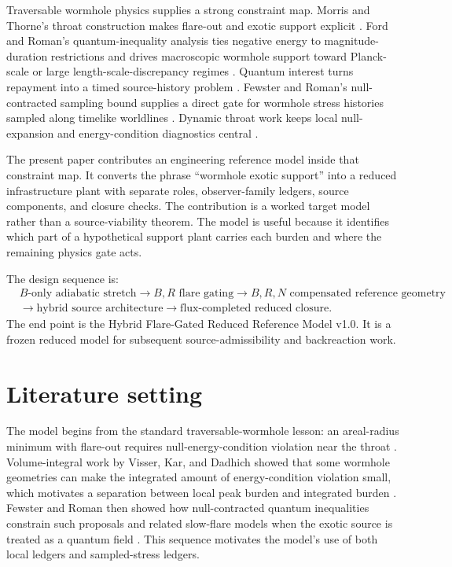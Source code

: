 \documentclass[11pt]{article}
\begin{document}
Traversable wormhole physics supplies a strong constraint map.  Morris and Thorne's throat construction makes flare-out and exotic support explicit \citep{morris_thorne_1988}.  Ford and Roman's quantum-inequality analysis ties negative energy to magnitude-duration restrictions and drives macroscopic wormhole support toward Planck-scale or large length-scale-discrepancy regimes \citep{ford_roman_1996}.  Quantum interest turns repayment into a timed source-history problem \citep{ford_roman_1999}.  Fewster and Roman's null-contracted sampling bound supplies a direct gate for wormhole stress histories sampled along timelike worldlines \citep{fewster_roman_2005}.  Dynamic throat work keeps local null-expansion and energy-condition diagnostics central \citep{hochberg_visser_1998}.

The present paper contributes an engineering reference model inside that constraint map.  It converts the phrase ``wormhole exotic support'' into a reduced infrastructure plant with separate roles, observer-family ledgers, source components, and closure checks.  The contribution is a worked target model rather than a source-viability theorem.  The model is useful because it identifies which part of a hypothetical support plant carries each burden and where the remaining physics gate acts.

The design sequence is:
\begin{equation}
\begin{aligned}
&B\text{-only adiabatic stretch}
\rightarrow B,R\text{ flare gating}
\rightarrow B,R,N\text{ compensated reference geometry}\\
&\rightarrow \text{hybrid source architecture}
\rightarrow \text{flux-completed reduced closure}.
\end{aligned}
\label{eq:design_sequence}
\end{equation}
The end point is the Hybrid Flare-Gated Reduced Reference Model v1.0.  It is a frozen reduced model for subsequent source-admissibility and backreaction work.

\section{Literature setting}

The model begins from the standard traversable-wormhole lesson: an areal-radius minimum with flare-out requires null-energy-condition violation near the throat \citep{morris_thorne_1988}.  Volume-integral work by Visser, Kar, and Dadhich showed that some wormhole geometries can make the integrated amount of energy-condition violation small, which motivates a separation between local peak burden and integrated burden \citep{visser_kar_dadhich_2003,kar_dadhich_visser_2004}.  Fewster and Roman then showed how null-contracted quantum inequalities constrain such proposals and related slow-flare models when the exotic source is treated as a quantum field \citep{fewster_roman_2005}.  This sequence motivates the model's use of both local ledgers and sampled-stress ledgers.
\end{document}
